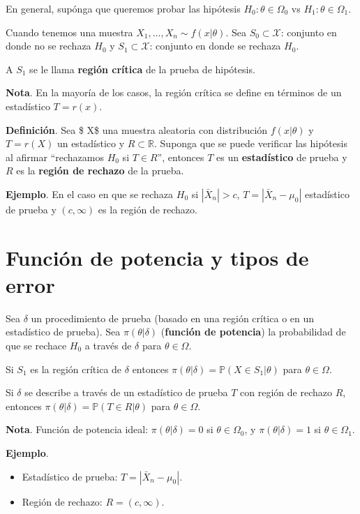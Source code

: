 \documentclass[
  12pt,
]{book}
\begin{document}
En general, supónga que queremos probar las hipótesis \(H_0: \theta \in \Omega_0\) vs \(H_1: \theta \in \Omega_1\).

Cuando tenemos una muestra \(X_1,\dots,X_n \sim f(x|\theta)\). Sea \(S_0\subset \mathcal X\): conjunto en donde no se rechaza \(H_0\) y \(S_1\subset \mathcal X\): conjunto en donde se rechaza \(H_0\).

A \(S_1\) se le llama \textbf{región crítica} de la prueba de hipótesis.

\textbf{Nota}. En la mayoría de los casos, la región crítica se define en términos de un estadístico \(T = r(x)\).

\textbf{Definición}. Sea \$ X\$ una muestra aleatoria con distribución \(f(x|\theta)\) y \(T=r(X)\) un estadístico y \(R\subset \mathbb R\). Suponga que se puede verificar las hipótesis al afirmar ``rechazamos \(H_0\) si \(T\in R\)'', entonces \(T\) es un \textbf{estadístico} de prueba y \(R\) es la \textbf{región de rechazo} de la prueba.

\textbf{Ejemplo}. En el caso en que se rechaza \(H_0\) si \(|\bar X_n|>c\), \(T = |\bar X_n-\mu_0|\) estadístico de prueba y \((c,\infty)\) es la región de rechazo.

\hypertarget{funciuxf3n-de-potencia-y-tipos-de-error}{%
\section{Función de potencia y tipos de error}\label{funciuxf3n-de-potencia-y-tipos-de-error}}

Sea \(\delta\) un procedimiento de prueba (basado en una región crítica o en un estadístico de prueba). Sea \(\pi(\theta|\delta)\) (\textbf{función de potencia}) la probabilidad de que se rechace \(H_0\) a través de \(\delta\) para \(\theta\in \Omega\).

Si \(S_1\) es la región crítica de \(\delta\) entonces \(\pi(\theta|\delta) = \mathbb P(X\in S_1|\theta)\) para \(\theta\in\Omega\).

Si \(\delta\) se describe a través de un estadístico de prueba \(T\) con región de rechazo \(R\), entonces \(\pi(\theta|\delta) = \mathbb P(T \in R|\theta)\) para \(\theta\in\Omega\).

\textbf{Nota}. Función de potencia ideal: \(\pi(\theta|\delta) = 0\) si \(\theta\in\Omega_0\), y \(\pi(\theta|\delta) = 1\) si \(\theta\in\Omega_1\).

\textbf{Ejemplo}.

\begin{itemize}
\item
  Estadístico de prueba: \(T = |\bar X_n-\mu_0|\).
\item
  Región de rechazo: \(R = (c,\infty)\).
\end{itemize}
\end{document}
